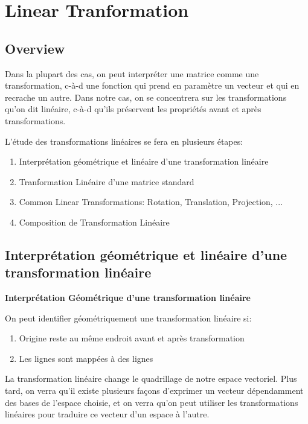 \documentclass{article}
\begin{document}
\section{Linear Tranformation}

\subsection{Overview}%
\label{sub:Overview}

Dans la plupart des cas, on peut interpréter une matrice comme une
transformation, c-à-d une fonction qui prend en paramètre un vecteur et qui
en recrache un autre. Dans notre cas, on se concentrera sur les transformations
qu'on dit linéaire, c-à-d qu'ils préservent les propriétés avant et après
transformations.

L'étude des transformations linéaires se fera en plusieurs étapes:
\begin{enumerate}
    \item Interprétation géométrique et linéaire d'une transformation linéaire
    \item Tranformation Linéaire d'une matrice standard
    \item Common Linear Transformations: Rotation, Translation, Projection, ...
    \item Composition de Transformation Linéaire
\end{enumerate}

\subsection{Interprétation géométrique et linéaire d'une transformation linéaire}

\textbf{Interprétation Géométrique d'une transformation linéaire}

On peut identifier géométriquement une transformation linéaire si:
\begin{enumerate}
    \item Origine reste au même endroit avant et après transformation
    \item Les lignes sont mappées à des lignes
\end{enumerate}

\begin{remark}
    La transformation linéaire change le quadrillage de notre espace vectoriel.
    Plus tard, on verra qu'il existe plusieurs façons d'exprimer un vecteur
    dépendamment des bases de l'espace choisie, et on verra qu'on peut
    utiliser les transformations linéaires pour traduire ce vecteur d'un
    espace à l'autre.
\end{remark}
\end{document}
